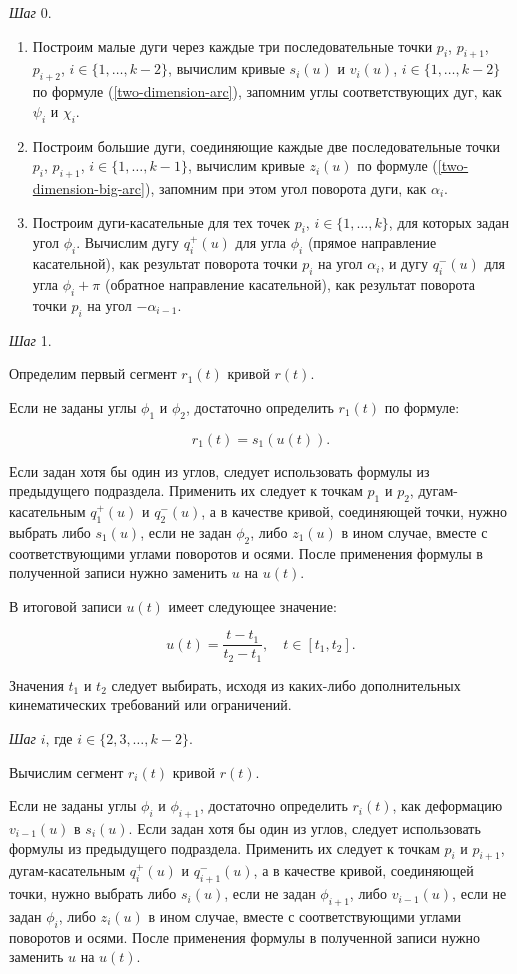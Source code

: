 \bigskip
\textit{Шаг} 0.

\begin{enumerate}
\item Построим малые дуги через каждые три последовательные точки $p_i$, $p_{i+1}$, $p_{i+2}$,
$i \in \{1,\dots,k-2\}$, вычислим кривые $s_i(u)$ и $v_i(u)$, $i \in \{1,\dots,k-2\}$ по формуле
(\ref{two-dimension-arc}), запомним углы соответствующих дуг, как $\psi_i$ и $\chi_i$.
\item Построим большие дуги, соединяющие каждые две последовательные точки $p_i$, $p_{i+1}$, $i \in \{1,\dots,k-1\}$,
вычислим кривые $z_i(u)$ по формуле (\ref{two-dimension-big-arc}), запомним при этом угол поворота дуги, как $\alpha_i$.
\item Построим дуги-касательные для тех точек $p_i$, $i \in \{1,\dots,k\}$, для которых задан угол $\phi_i$.
Вычислим дугу $q_i^+(u)$ для угла $\phi_i$ (прямое направление касательной), как результат поворота точки $p_i$
на угол $\alpha_i$, и дугу $q_i^-(u)$ для угла $\phi_i+\pi$ (обратное направление касательной), как результат поворота
точки $p_i$ на угол $-\alpha_{i-1}$.
\end{enumerate}

\bigskip
\textit{Шаг} 1.

Определим первый сегмент $r_1(t)$ кривой $r(t)$.

Если не заданы углы $\phi_1$ и $\phi_2$, достаточно определить $r_1(t)$ по формуле:

$$
r_1(t)=s_1(u(t)).
$$

Если задан хотя бы один из углов, следует использовать формулы из предыдущего подраздела. Применить их следует к
точкам $p_1$ и $p_2$, дугам-касательным $q_1^+(u)$ и $q_2^-(u)$, а в качестве кривой, соединяющей точки, нужно
выбрать либо $s_1(u)$, если не задан $\phi_2$, либо $z_1(u)$ в ином случае, вместе с соответствующими углами
поворотов и осями. После применения формулы в полученной записи нужно заменить $u$ на $u(t)$.

В итоговой записи $u(t)$ имеет следующее значение:

$$
u(t)=\frac{t-t_1}{t_2-t_1}, \quad t \in [t_1,t_2].
$$

Значения $t_1$ и $t_2$ следует выбирать, исходя из каких-либо дополнительных кинематических требований или ограничений.

\bigskip
\textit{Шаг} $i$, где $i \in \{2,3,\dots,k-2\}$.

Вычислим сегмент $r_i(t)$ кривой $r(t)$.

Если не заданы углы $\phi_i$ и $\phi_{i+1}$, достаточно определить $r_i(t)$, как деформацию $v_{i-1}(u)$ в $s_i(u)$.
Если задан хотя бы один из углов, следует использовать формулы из предыдущего подраздела. Применить их следует к
точкам $p_i$ и $p_{i+1}$, дугам-касательным $q_i^+(u)$ и $q_{i+1}^-(u)$, а в качестве кривой, соединяющей точки,
нужно выбрать либо $s_i(u)$, если не задан $\phi_{i+1}$, либо $v_{i-1}(u)$, если не задан $\phi_i$, либо $z_i(u)$
в ином случае, вместе с соответствующими углами поворотов и осями. После применения формулы в полученной записи нужно
заменить $u$ на $u(t)$.

